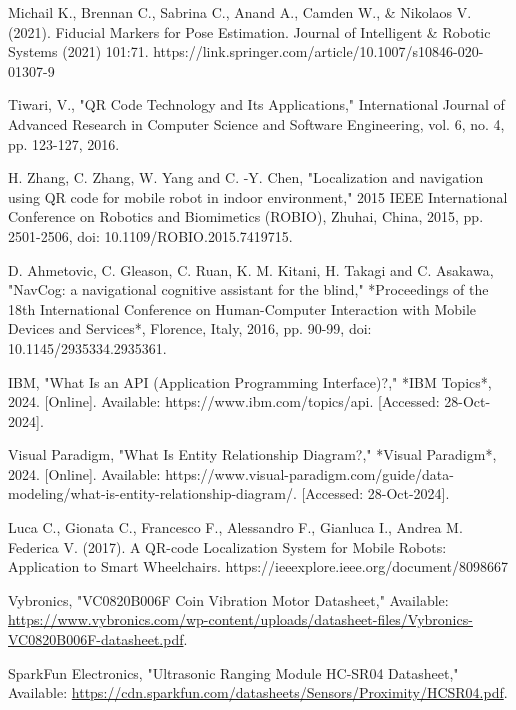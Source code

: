 
\newpage
{}
\renewcommand{\bibname}{References}

\begin{thebibliography}{9}
	Michail K., Brennan C., Sabrina C., Anand A., Camden W., \& Nikolaos
	V. (2021). Fiducial Markers for Pose Estimation. Journal of Intelligent \&
	Robotic Systems (2021) 101:71.
	https://link.springer.com/article/10.1007/s10846-020-01307-9
		
	 Tiwari, V., "QR Code Technology and Its Applications," International Journal of Advanced Research in Computer Science and Software Engineering, vol. 6, no. 4, pp. 123-127, 2016.
	
	H. Zhang, C. Zhang, W. Yang and C. -Y. Chen, "Localization and navigation using QR code for mobile robot in indoor environment," 2015 IEEE International Conference on Robotics and Biomimetics (ROBIO), Zhuhai, China, 2015, pp. 2501-2506, doi: 10.1109/ROBIO.2015.7419715.
	
	D. Ahmetovic, C. Gleason, C. Ruan, K. M. Kitani, H. Takagi and C. Asakawa, "NavCog: a navigational cognitive assistant for the blind," *Proceedings of the 18th International Conference on Human-Computer Interaction with Mobile Devices and Services*, Florence, Italy, 2016, pp. 90-99, doi: 10.1145/2935334.2935361.
	
	IBM, "What Is an API (Application Programming Interface)?," *IBM Topics*, 2024. [Online]. Available: https://www.ibm.com/topics/api. [Accessed: 28-Oct-2024].
	
	Visual Paradigm, "What Is Entity Relationship Diagram?," *Visual Paradigm*, 2024. [Online]. Available: https://www.visual-paradigm.com/guide/data-modeling/what-is-entity-relationship-diagram/. [Accessed: 28-Oct-2024].
	

	Luca C., Gionata C., Francesco F., Alessandro F., Gianluca I., Andrea M. Federica V. (2017). A QR-code Localization System for Mobile Robots: Application to Smart Wheelchairs.
	https://ieeexplore.ieee.org/document/8098667
	
	Vybronics, "VC0820B006F Coin Vibration Motor Datasheet," 
	Available: \url{https://www.vybronics.com/wp-content/uploads/datasheet-files/Vybronics-VC0820B006F-datasheet.pdf}.
	
	
	SparkFun Electronics, "Ultrasonic Ranging Module HC-SR04 Datasheet," 
	Available: \url{https://cdn.sparkfun.com/datasheets/Sensors/Proximity/HCSR04.pdf}.
	

\end{thebibliography}
